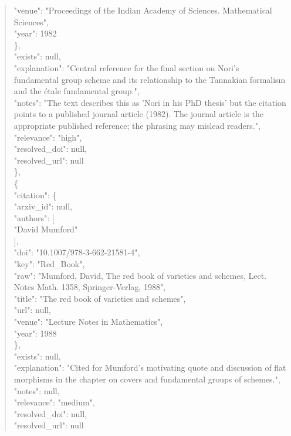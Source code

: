 \documentclass[11pt]{article}
\begin{document}
\begin{quote}
        "venue": "Proceedings of the Indian Academy of Sciences. Mathematical Sciences",\\
        "year": 1982\\
      \},\\
      "exists": null,\\
      "explanation": "Central reference for the final section on Nori's fundamental group scheme and its relationship to the Tannakian formalism and the étale fundamental group.",\\
      "notes": "The text describes this as 'Nori in his PhD thesis' but the citation points to a published journal article (1982). The journal article is the appropriate published reference; the phrasing may mislead readers.",\\
      "relevance": "high",\\
      "resolved\_doi": null,\\
      "resolved\_url": null\\
    \},\\
    \{\\
      "citation": \{\\
        "arxiv\_id": null,\\
        "authors": [\\
          "David Mumford"\\
        ],\\
        "doi": "10.1007/978-3-662-21581-4",\\
        "key": "Red\_Book",\\
        "raw": "Mumford, David, The red book of varieties and schemes, Lect. Notes Math. 1358, Springer-Verlag, 1988",\\
        "title": "The red book of varieties and schemes",\\
        "url": null,\\
        "venue": "Lecture Notes in Mathematics",\\
        "year": 1988\\
      \},\\
      "exists": null,\\
      "explanation": "Cited for Mumford's motivating quote and discussion of flat morphisms in the chapter on covers and fundamental groups of schemes.",\\
      "notes": null,\\
      "relevance": "medium",\\
      "resolved\_doi": null,\\
      "resolved\_url": null\\

\end{quote}
\end{document}
